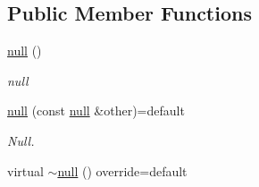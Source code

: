 \subsection*{Public Member Functions}
\begin{DoxyCompactItemize}
\item 
\hyperlink{classformat_1_1null_ad9f30cebcd6641b4a4a57df7ae069851}{null} ()\hypertarget{classformat_1_1null_ad9f30cebcd6641b4a4a57df7ae069851}{}\label{classformat_1_1null_ad9f30cebcd6641b4a4a57df7ae069851}

\begin{DoxyCompactList}\small\item\em null \end{DoxyCompactList}\item 
\hyperlink{classformat_1_1null_ad406608e47f7aa9975992f23b99bd996}{null} (const \hyperlink{classformat_1_1null}{null} \&other)=default
\begin{DoxyCompactList}\small\item\em Null. \end{DoxyCompactList}\item 
virtual \hyperlink{classformat_1_1null_a4d04350101ca2371ad0063467182f5a1}{$\sim$null} () override=default\hypertarget{classformat_1_1null_a4d04350101ca2371ad0063467182f5a1}{}\label{classformat_1_1null_a4d04350101ca2371ad0063467182f5a1}


\end{DoxyCompactItemize}
